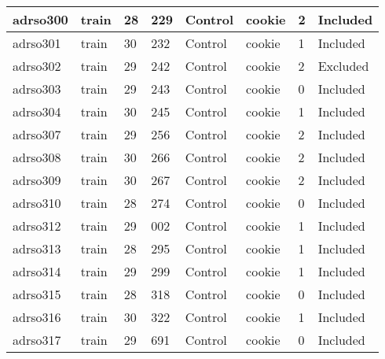 \begin{center}
\begin{longtable}{|l|l|l|l|l|l|l|l|}
adrso300  & train            & 28           & 229         & Control              & cookie          & 2                & Included      \\ \hline
adrso301  & train            & 30           & 232         & Control              & cookie          & 1                & Included      \\ \hline
adrso302  & train            & 29           & 242         & Control              & cookie          & 2                & Excluded      \\ \hline
adrso303  & train            & 29           & 243         & Control              & cookie          & 0                & Included      \\ \hline
adrso304  & train            & 30           & 245         & Control              & cookie          & 1                & Included      \\ \hline
adrso307  & train            & 29           & 256         & Control              & cookie          & 2                & Included      \\ \hline
adrso308  & train            & 30           & 266         & Control              & cookie          & 2                & Included      \\ \hline
adrso309  & train            & 30           & 267         & Control              & cookie          & 2                & Included      \\ \hline
adrso310  & train            & 28           & 274         & Control              & cookie          & 0                & Included      \\ \hline
adrso312  & train            & 29           & 002         & Control              & cookie          & 1                & Included      \\ \hline
adrso313  & train            & 28           & 295         & Control              & cookie          & 1                & Included      \\ \hline
adrso314  & train            & 29           & 299         & Control              & cookie          & 1                & Included      \\ \hline
adrso315  & train            & 28           & 318         & Control              & cookie          & 0                & Included      \\ \hline
adrso316  & train            & 30           & 322         & Control              & cookie          & 1                & Included      \\ \hline
adrso317  & train            & 29           & 691         & Control              & cookie          & 0                & Included     \\ \hline
\end{longtable}
\normalsize
\end{center}
